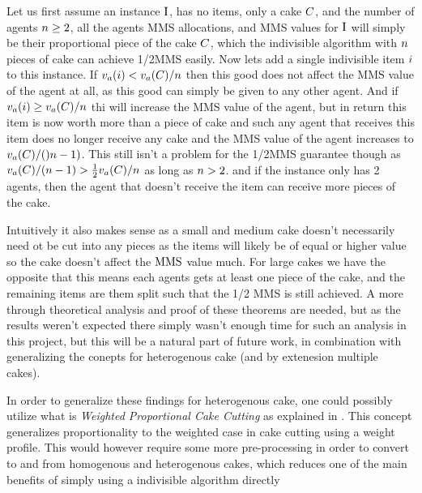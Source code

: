 Let us first assume an instance $\sInstance$, has no items, only a cake $C$, and the number of agents $n\geq2$, all the agents MMS allocations, and MMS values for $\sInstance$ will simply be their proportional piece of the cake $C$, which the indivisible algorithm with $n$ pieces of cake can achieve 1/2MMS easily. Now lets add a single indivisible item $i$ to this instance. If $v_a(i)<v_a(C)/n$ then this good does not affect the MMS value of the agent at all, as this good can simply be given to any other agent. And if $v_a(i)\geq v_a(C)/n$ thi will increase the MMS value of the agent, but in return this item is now worth more than a piece of cake and such any agent that receives this item does no longer receive any cake and the MMS value of the agent increases to $v_a(C)/()n-1)$. This still isn't a problem for the 1/2MMS guarantee though as $v_a(C)/(n-1)>\frac{1}{2}v_a(C)/n$ as long as $n>2$. and if the instance only has 2 agents, then the agent that doesn't receive the item can receive more pieces of the cake.

Intuitively it also makes sense as a small and medium cake doesn't necessarily need ot be cut into any pieces as the items will likely be of equal or higher value so the cake doesn't affect the $\text{MMS}$ value much. For large cakes we have the opposite that this means each agents gets at least one piece of the cake, and the remaining items are them split such that the 1/2 MMS is still achieved. A more through theoretical analysis and proof of these theorems are needed, but as the results weren't expected there simply wasn't enough time for such an analysis in this project, but this will be a natural part of future work, in combination with generalizing the conepts for heterogenous cake (and by extenesion multiple cakes).

In order to generalize these findings for heterogenous cake, one could possibly utilize what is  \emph{Weighted Proportional Cake Cutting} as explained in \cite{mms}. This concept generalizes proportionality to the weighted case in cake cutting using a weight profile. This would however require some more pre-processing in order to convert to and from homogenous and heterogenous cakes, which reduces one of the main benefits of simply using a indivisible algorithm directly

